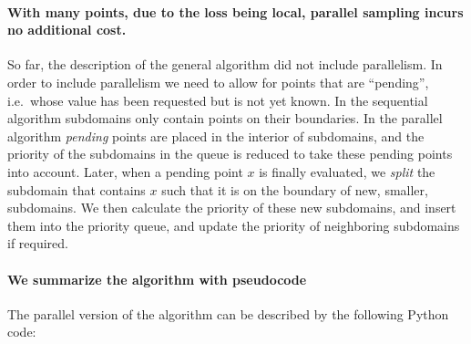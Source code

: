 \documentclass[english, twocolumn, 10pt, aps, superscriptaddress, floatfix, prb, citeautoscript]{revtex4-1}
\begin{document}
\paragraph{With many points, due to the loss being local, parallel sampling incurs no additional cost.}

So far, the description of the general algorithm did not include parallelism.
In order to include parallelism we need to allow for points that are ``pending'', i.e.~whose value has been requested but is not yet known.
In the sequential algorithm subdomains only contain points on their boundaries.
In the parallel algorithm \emph{pending} points are placed in the interior of subdomains, and the priority of the subdomains in the queue is reduced to take these pending points into account.
Later, when a pending point \(x\) is finally evaluated, we \emph{split} the subdomain that contains \(x\) such that it is on the boundary of new, smaller, subdomains.
We then calculate the priority of these new subdomains, and insert them into the priority queue, and update the priority of neighboring subdomains if required.

\paragraph{We summarize the algorithm with pseudocode}

The parallel version of the algorithm can be described by the following Python code:
\end{document}
